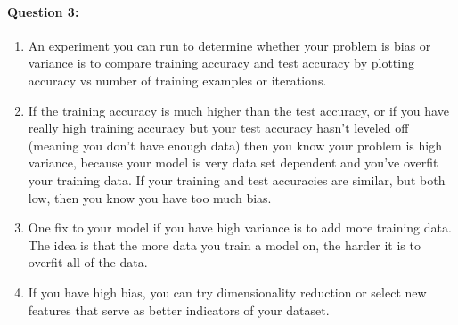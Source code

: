 \documentclass[letterpaper,11pt]{article}
\begin{document}
\paragraph{Question 3:}
\begin{enumerate}[1.]
\item
    An experiment you can run to determine whether your problem is bias or variance
    is to compare training accuracy and test accuracy
    by plotting accuracy vs number of training examples or iterations.
\item
    If the training accuracy is much higher than the test accuracy, or if you
    have really high training accuracy but your test accuracy hasn't leveled
    off (meaning you don't have enough data) then you know your problem is
    high variance, because your model is very data set dependent and you've
    overfit your training data. If your training and test accuracies are similar,
    but both low, then you know you have too much bias.

\item
    One fix to your model if you have high variance is to add more training
    data. The idea is that the more data you train a model on, the harder it
    is to overfit all of the data.

\item
    If you have high bias, you can try dimensionality reduction or select
    new features that serve as better indicators of your dataset.

\end{enumerate}
\end{document}
